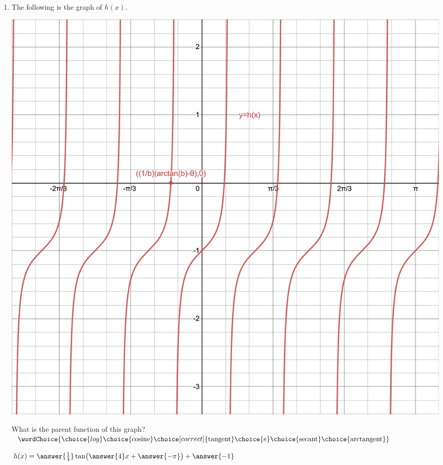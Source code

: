 \documentclass{ximera}
\begin{document}
\begin{exercise}
\begin{enumerate}
\item The following is the graph of $h(x)$.
\begin{center}
\includegraphics[width=1\linewidth]{tanGraphwithHintpoint.png}
\end{center}
What is the parent function of this graph?\\
$\wordChoice{\choice{log}\choice{\text{cosine}}\choice[correct]{\text{tangent}}\choice{e}\choice{\text{secant}}\choice{\text{arctangent}}}$
\begin{exercise}
	$h(x) = \answer{\frac{1}{4}}\tan\!\big(\answer{4}x + \answer{-\pi}\big)+\answer{-1}$
\end{exercise}
	
\end{enumerate}
\end{exercise}
\end{document}
